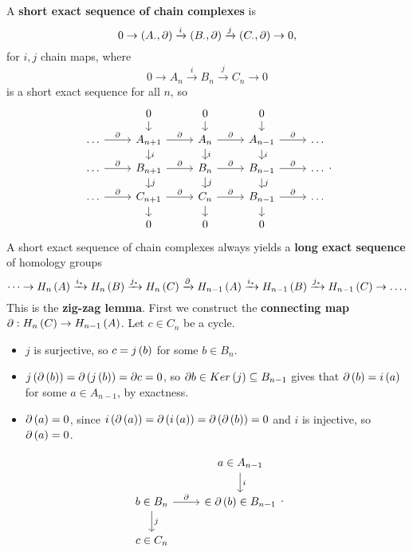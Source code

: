 A \textbf{short exact sequence of chain complexes} is
$$ 0 \to \left( A_\cdot, \partial \right) \xrightarrow{i} \left( B_\cdot, \partial \right) \xrightarrow{j} \left( C_\cdot, \partial \right) \to 0, $$
for $ i, j $ chain maps, where
$$ 0 \to A_n \xrightarrow{i} B_n \xrightarrow{j} C_n \to 0 $$
is a short exact sequence for all $ n $, so
$$
\begin{tikzcd}[row sep=small]
& 0 \arrow{d} & 0 \arrow{d} & 0 \arrow{d} & \\
\dots \arrow{r}{\partial} & A_{n + 1} \arrow{r}{\partial} \arrow{d}{i} & A_n \arrow{r}{\partial} \arrow{d}{i} & A_{n - 1} \arrow{r}{\partial} \arrow{d}{i} & \dots \\
\dots \arrow{r}{\partial} & B_{n + 1} \arrow{r}{\partial} \arrow{d}{j} & B_n \arrow{r}{\partial} \arrow{d}{j} & B_{n - 1} \arrow{r}{\partial} \arrow{d}{j} & \dots \\
\dots \arrow{r}{\partial} & C_{n + 1} \arrow{r}{\partial} \arrow{d} & C_n \arrow{r}{\partial} \arrow{d} & B_{n - 1} \arrow{r}{\partial} \arrow{d} & \dots \\
& 0 & 0 & 0 &
\end{tikzcd}.
$$
A short exact sequence of chain complexes always yields a \textbf{long exact sequence} of homology groups
$$ \dots \to H_n\left( A \right) \xrightarrow{i_*} H_n\left( B \right) \xrightarrow{j_*} H_n\left( C \right) \xrightarrow{\partial} H_{n - 1}\left( A \right) \xrightarrow{i_*} H_{n - 1}\left( B \right) \xrightarrow{j_*} H_{n - 1}\left( C \right) \to \dots. $$
This is the \textbf{zig-zag lemma}. First we construct the \textbf{connecting map} $ \partial : H_n\left( C \right) \to H_{n - 1}\left( A \right) $. Let $ c \in C_n $ be a cycle.
\begin{itemize}
\item $ j $ is surjective, so $ c = j\left( b \right) $ for some $ b \in B_n $.
\item $ j\left( \partial\left( b \right) \right) = \partial\left( j\left( b \right) \right) = \partial c = 0 $, so $ \partial b \in Ker\left( j \right) \subseteq B_{n - 1} $ gives that $ \partial\left( b \right) = i\left( a \right) $ for some $ a \in A_{n - 1} $, by exactness.
\item $ \partial\left( a \right) = 0 $, since $ i\left( \partial\left( a \right) \right) = \partial\left( i\left( a \right) \right) = \partial\left( \partial\left( b \right) \right) = 0 $ and $ i $ is injective, so $ \partial\left( a \right) = 0 $.
\end{itemize}
$$
\begin{tikzcd}
& a \in A_{n - 1} \arrow{d}{i} \\
b \in B_n \arrow{r}{\partial} \arrow{d}{j} & \in \partial\rb{b} \in B_{n - 1} \\
c \in C_n &
\end{tikzcd}.
$$
